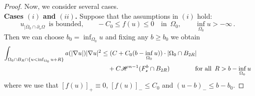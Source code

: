 \documentclass[10 pt,a4paper]{article}
\theoremstyle{definition}
\begin{document}
\begin{proof}
	Now, we consider several cases. \\[0.2cm]
	\textbf{Cases $(i)$ and $(ii)$.} Suppose that the assumptions in $(i)$ hold:
	\[
		u_{|\overline{\Omega}_0 \cap \partial_\star\Omega} \, \text{ is bounded,} \qquad -C_0 \leq f(u) \leq 0 \quad \text{in } \, \Omega_0, \qquad \inf_{\Omega_0} u > -\infty \, .
	\]
	Then we can choose $b_0 = \inf_{\Omega_0} u$ and fixing any $b\geq b_0$ we obtain
	\begin{align*}
		\int_{\Omega_0 \cap B_R \cap \{u < \inf_{\Omega_0} u+R\}} a(|\nabla u|) |\nabla u|^2 & \leq (C + C_0(b-\inf_{\Omega_0} u)) \cdot |\Omega_0 \cap B_{2R}| \\
		& \phantom{=\;} + C \mathscr{H}^{n-1}(F^b_\star \cap B_{2R}) \qquad \qquad \text{for all } \, R > b-\inf_{\Omega_0} u
	\end{align*}
	where we use that $[f(u)]_+ \equiv 0$, $[f(u)]_- \leq C_0$ and $(u-b)_- \leq b-b_0$. 
	

\end{proof}
\end{document}
